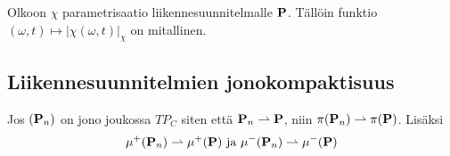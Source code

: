\begin{corollary}
    Olkoon $\chi$ parametrisaatio liikennesuunnitelmalle $\P$. Tällöin funktio $(\omega, t) \mapsto |\chi(\omega, t)|_\chi$ on mitallinen.
\end{corollary}

\subsection{Liikennesuunnitelmien jonokompaktisuus}

\begin{theorem}\label{le:tfPlanWeakConv}
    Jos $(\P_n)$ on jono joukossa $TP_C$ siten että $\P_n \rightharpoonup \P$, niin $\pi(\P_n) \rightharpoonup \pi(\P)$. Lisäksi 
    \begin{equation*}
    \mu^+(\P_n) \rightharpoonup \mu^+(\P) \text{ ja }  \mu^-(\P_n) \rightharpoonup \mu^-(\P) 
    \end{equation*}
    
\end{theorem}
